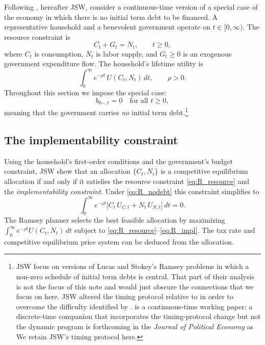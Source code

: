 \documentclass[12pt]{article}
\begin{document}
Following \citet{JiangSargentWang2024}, hereafter JSW, consider a continuous-time version of a special case of the \citet{LucasStokey1983} economy in which there is no initial term debt to be financed.  A representative household and a
benevolent government operate on $t \in [0,\infty)$.  The resource constraint
is
\begin{equation}\label{eq:R_resource}
  C_t + G_t = N_t, \qquad t \ge 0,
\end{equation}
where $C_t$ is consumption, $N_t$ is labor supply, and $G_t \ge 0$ is an
exogenous government expenditure flow.  The household's lifetime utility is
\begin{equation}\label{eq:R_utility}
  \int_0^\infty e^{-\rho t}\, U(C_t, N_t)\, dt, \qquad \rho > 0.
\end{equation}
Throughout this section we impose the special case:
\begin{equation}\label{eq:R_nodebt}
  b_{0-,t} = 0 \quad \text{for all } t \ge 0,
\end{equation}
meaning that the government carries \emph{no} initial term debt.\footnote{JSW focus on versions of Lucas and Stokey's Ramsey problems in which a non-zero schedule of initial term debts is  central. That part of their analysis is not the focus of this note and would just obscure the connections that we focus on here.  JSW altered the timing protocol relative to \citet{LucasStokey1983} in order to overcome the difficulty identified by \citet{debortoli2021optimal}.  \citet{JiangSargentWang2024} is a continuous-time working paper; a discrete-time companion that incorporates the timing-protocol change but not the dynamic program is forthcoming in the \emph{Journal of Political Economy} as \citet{JiangSargentWang2025} We retain JSW's timing protocol here.}


\subsection{The implementability constraint}

Using the household's first-order conditions and the government's budget
constraint, JSW show that an allocation $\{C_t, N_t\}$ is a competitive
equilibrium allocation if and only if it satisfies the resource constraint
\eqref{eq:R_resource} and the \emph{implementability constraint}.  Under
\eqref{eq:R_nodebt} this constraint simplifies to
\begin{equation}\label{eq:R_impl}
  \int_0^\infty e^{-\rho t}\bigl[C_t\, U_{C,t} + N_t\, U_{N,t}\bigr]\, dt = 0.
\end{equation}
The Ramsey planner selects the best feasible allocation by maximizing
$\int_0^\infty e^{-\rho t} U(C_t, N_t)\, dt$ subject to
\eqref{eq:R_resource}--\eqref{eq:R_impl}. The tax rate and competitive equilibrium price system can be deduced from
the allocation.
\end{document}
